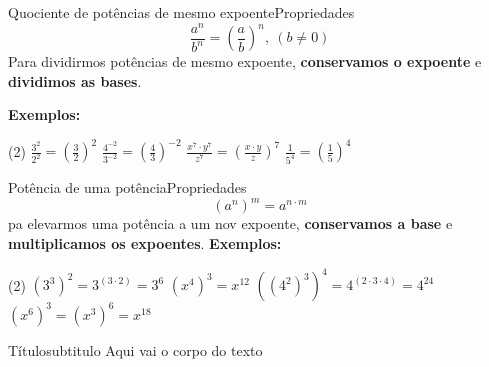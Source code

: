 \documentclass[aspectratio=169,11pt]{uu-beamer}
\begin{document}
    \begin{frame}{Quociente de potências de mesmo expoente}{Propriedades}
        \[\frac{a^n}{b^n} = \left( \frac{a}{b} \right)^n,~(b \neq 0) \]
        Para dividirmos potências de mesmo expoente, \textbf{conservamos o expoente} e \textbf{dividimos as bases}.
        
        
        \vspace{1cm}
        \textbf{Exemplos:}
        \begin{tasks}(2)
            \task \(\frac{3^2}{2^2} = \left(\frac{3}{2} \right)^2\)
            \task \(\frac{4^{-2}}{3^{-2}} = \left( \frac{4}{3}\right)^{-2}\)
            \task \(\frac{x^7 \cdot y^7}{z^7} = \left(\frac{x \cdot y}{z} \right)^7\)
            \task \(\frac{1}{5^4} = \left( \frac{1}{5}\right)^4\)
        \end{tasks}
    \end{frame}
    
    \begin{frame}{Potência de uma potência}{Propriedades}
        \[(a^n)^m = a^{n \cdot m}\]
        pa elevarmos uma potência a um nov expoente, \textbf{conservamos a base} e \textbf{multiplicamos os expoentes}.
        \vspace{1cm}
        \textbf{Exemplos:}
        \begin{tasks}(2)
            \task \((3^3)^2 = 3^{(3 \cdot 2)} = 3^6\)
            \task \((x^4)^3 = x^{12}\)
            \task \(\left( \left( 4^2 \right)^3 \right)^4 = 4^{(2 \cdot 3 \cdot 4)} = 4^{24}\)
            \task \((x^6)^3 = (x^3)^6 = x^{18}\)
        \end{tasks}
    \end{frame}
    
    
    \begin{frame}{Título}{subtitulo}
        Aqui vai o corpo do texto
        
    \end{frame}
\end{document}
